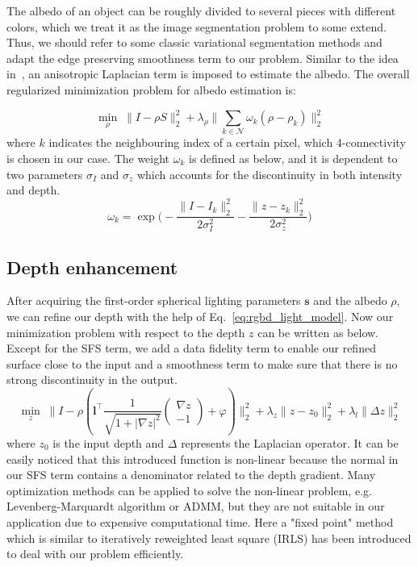 The albedo of an object can be roughly divided to several pieces with different colors, which we treat it as the image segmentation problem to some extend. 
Thus, we should refer to some classic variational segmentation methods and adapt the edge preserving smoothness term to our problem.
Similar to the idea in~\cite{casaca2014laplacian}, an anisotropic Laplacian term is imposed to estimate the albedo.
The overall regularized minimization problem for albedo estimation is:

\begin{equation}\label{eq:rgbd_albedo_estimate}
	\min_{\rho} \; \lVert I - \rho S\rVert^2_2 + \lambda_{\rho} \lVert \sum_{k \in \mathcal{N}} \omega_k (\rho - \rho_k) \rVert^2_2
\end{equation}
where $k$ indicates the neighbouring index of a certain pixel, which 4-connectivity is chosen in our case. 
The weight $\omega_k$ is defined as below, and it is dependent to two parameters $\sigma_I$ and $\sigma_z$ which accounts for the discontinuity in both intensity and depth.
\begin{equation}
	\omega_k=\exp\Bigg(-\dfrac{\lVert I - I_k \rVert^2_2}{2\sigma_I^2} -\dfrac{\lVert z - z_k \rVert^2_2}{2\sigma_z^2}\Bigg)
\end{equation}

\subsection{Depth enhancement}
After acquiring the first-order spherical lighting parameters $\mathbf{s}$ and the albedo $\rho$, we can refine our depth with the help of Eq.~\ref{eq:rgbd_light_model}.
Now our minimization problem with respect to the depth $z$ can be written as below. 
Except for the SFS term, we add a data fidelity term to enable our refined surface close to the input and a smoothness term to make sure that there is no strong discontinuity in the output. 
\begin{equation}\label{eq:rgbd_depth_refine}
	\min_{z} \; \lVert I - \rho (\mathbf{l}^\top \frac{1}{\sqrt{1 + |\nabla z|^2}} \begin{pmatrix} \nabla z\\ -1 \end{pmatrix} + \varphi) \rVert^2_2 + \lambda_z \lVert z - z_0\rVert^2_2 + \lambda_l \lVert \Delta z \rVert^2_2
\end{equation}
where $z_0$ is the input depth and $\Delta$ represents the Laplacian operator. 
It can be easily noticed that this introduced function is non-linear because the normal in our SFS term contains a denominator related to the depth gradient. 
Many optimization methods can be applied to solve the non-linear problem, e.g. Levenberg-Marquardt algorithm or ADMM, but they are not suitable in our application due to expensive computational time. 
Here a "fixed point" method which is similar to iteratively reweighted least square (IRLS) has been introduced to deal with our problem efficiently. 

